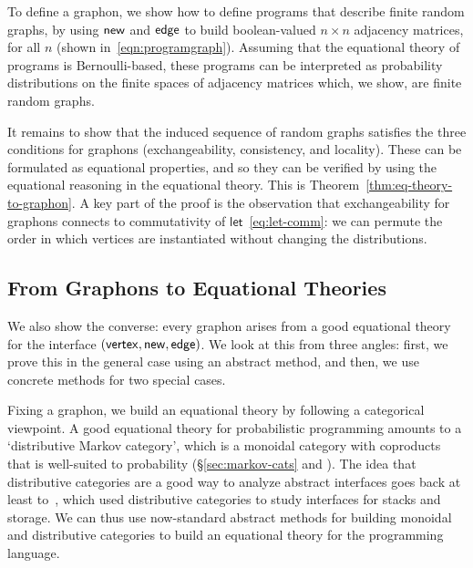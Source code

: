 To define a graphon, we show how to define programs that describe finite random graphs, by using
$\mathsf{new}$ and $\mathsf{edge}$ to build boolean-valued $n\times n$ adjacency
matrices, for all $n$ (shown in~\eqref{eqn:programgraph}).
Assuming that the equational theory of programs is Bernoulli-based,
these programs can be interpreted as probability distributions on the
finite spaces of adjacency matrices which, we show, are finite random graphs.  

It remains to show that the induced sequence of random graphs
satisfies the three conditions for graphons (exchangeability,
consistency, and locality). These can be formulated as equational
properties, and so they can be verified by using the equational
reasoning in the equational theory. This is Theorem~\ref{thm:eq-theory-to-graphon}.
A key part of the proof is the observation that exchangeability for graphons
connects to commutativity of $\mathsf{let}$~\eqref{eq:let-comm}: we can permute the order in which
vertices are instantiated without changing the distributions. 


\subsection{From Graphons to Equational Theories}
\label{sec:intro:graphons-to-equations}
We also show the converse: every graphon arises from a good
equational theory for the interface $(\mathsf{vertex},\mathsf{new},\mathsf{edge})$.
We look at this from three angles: first, we prove this in the general
case using an abstract method, and then, we use concrete methods for
two special cases.

Fixing a graphon, we build an equational theory by following a
categorical viewpoint. A good equational theory for probabilistic
programming amounts to a `distributive Markov category', which is a
monoidal category with coproducts that is well-suited to probability
(\S\ref{sec:markov-cats} and \cite{fritz}). The idea that distributive categories
are a good way to analyze abstract interfaces goes back at least
to~\cite{walters}, which used distributive categories to study
interfaces for stacks and storage. 
We can thus use now-standard abstract methods for building monoidal and
distributive categories to build an equational theory for the
programming language.

